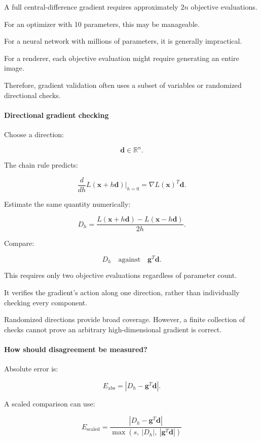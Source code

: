 A full central-difference gradient requires approximately \(2n\) objective evaluations.

For an optimizer with 10 parameters, this may be manageable.

For a neural network with millions of parameters, it is generally impractical.

For a renderer, each objective evaluation might require generating an entire image.

Therefore, gradient validation often uses a subset of variables or randomized directional checks.

\paragraph{Directional gradient checking}\label{02-foundations-ii-ch022-directional-gradient-checking}

Choose a direction:

\[
\mathbf d\in\mathbb R^n.
\]

The chain rule predicts:

\[
\frac{d}{dh}L(\mathbf x+h\mathbf d)\bigg|_{h=0} = \nabla L(\mathbf x)^T\mathbf d.
\]

Estimate the same quantity numerically:

\[
\boxed{ D_h= \frac{ L(\mathbf x+h\mathbf d)- L(\mathbf x-h\mathbf d) }{2h} }.
\]

Compare:

\[
D_h \quad\text{against}\quad \mathbf g^T\mathbf d.
\]

This requires only two objective evaluations regardless of parameter count.

It verifies the gradient's action along one direction, rather than individually checking every component.

Randomized directions provide broad coverage. However, a finite collection of checks cannot prove an arbitrary high-dimensional gradient is correct.

\paragraph{How should disagreement be measured?}\label{02-foundations-ii-ch022-how-should-disagreement-be-measured}

Absolute error is:

\[
E_{\mathrm{abs}}= |D_h-\mathbf g^T\mathbf d|.
\]

A scaled comparison can use:

\[
\boxed{ E_{\mathrm{scaled}} = \frac{ |D_h-\mathbf g^T\mathbf d| }{ \max(s,\ |D_h|,\ |\mathbf g^T\mathbf d|) } }
\]


